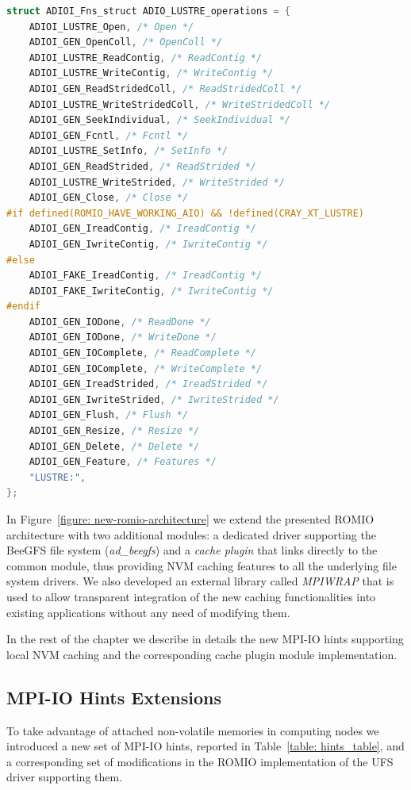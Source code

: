\begin{lstlisting}[language=C, caption=Operation Table for Lustre Driver, label={list: lustre_table}]
struct ADIOI_Fns_struct ADIO_LUSTRE_operations = {
    ADIOI_LUSTRE_Open, /* Open */
    ADIOI_GEN_OpenColl, /* OpenColl */
    ADIOI_LUSTRE_ReadContig, /* ReadContig */
    ADIOI_LUSTRE_WriteContig, /* WriteContig */
    ADIOI_GEN_ReadStridedColl, /* ReadStridedColl */
    ADIOI_LUSTRE_WriteStridedColl, /* WriteStridedColl */
    ADIOI_GEN_SeekIndividual, /* SeekIndividual */
    ADIOI_GEN_Fcntl, /* Fcntl */
    ADIOI_LUSTRE_SetInfo, /* SetInfo */
    ADIOI_GEN_ReadStrided, /* ReadStrided */
    ADIOI_LUSTRE_WriteStrided, /* WriteStrided */
    ADIOI_GEN_Close, /* Close */
#if defined(ROMIO_HAVE_WORKING_AIO) && !defined(CRAY_XT_LUSTRE)
    ADIOI_GEN_IreadContig, /* IreadContig */
    ADIOI_GEN_IwriteContig, /* IwriteContig */
#else
    ADIOI_FAKE_IreadContig, /* IreadContig */
    ADIOI_FAKE_IwriteContig, /* IwriteContig */
#endif
    ADIOI_GEN_IODone, /* ReadDone */
    ADIOI_GEN_IODone, /* WriteDone */
    ADIOI_GEN_IOComplete, /* ReadComplete */
    ADIOI_GEN_IOComplete, /* WriteComplete */
    ADIOI_GEN_IreadStrided, /* IreadStrided */
    ADIOI_GEN_IwriteStrided, /* IwriteStrided */
    ADIOI_GEN_Flush, /* Flush */
    ADIOI_GEN_Resize, /* Resize */
    ADIOI_GEN_Delete, /* Delete */
    ADIOI_GEN_Feature, /* Features */
    "LUSTRE:",
};
\end{lstlisting}

In Figure~\ref{figure: new-romio-architecture} we extend the presented ROMIO architecture with two additional modules: a dedicated driver supporting the BeeGFS file system (\textit{ad\_beegfs}) and a \textit{cache plugin} that links directly to the
common module, thus providing NVM caching features to all the underlying file system drivers. We also developed an external library called \textit{MPIWRAP} that is used to allow transparent integration of the new caching functionalities into existing 
applications without any need of modifying them. 

In the rest of the chapter we describe in details the new MPI-IO hints supporting local NVM caching and the corresponding cache plugin module implementation.

\subsection{MPI-IO Hints Extensions}
To take advantage of attached non-volatile memories in computing nodes we introduced a new set of MPI-IO hints, reported in Table~\ref{table: hints_table}, and a corresponding set of modifications in the ROMIO implementation of the UFS driver 
supporting them.

